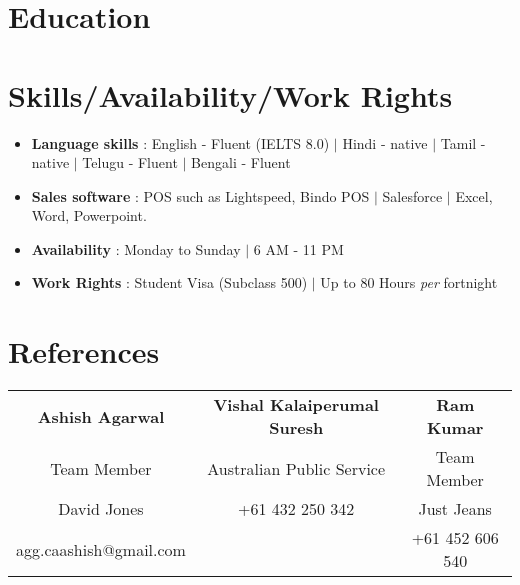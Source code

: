 \documentclass{resume_class_casual}
\begin{document}
	\section{Education}
	\section{Skills/Availability/Work Rights}
	\begin{itemize}[leftmargin = 10pt , labelsep = 3pt , parsep = 0pt , itemsep = 1pt , label =  {\small $\bullet$} ] 
		\item \mdseries \Large { \textbf{Language skills} : English - Fluent (IELTS 8.0) $|$ Hindi - native $|$ Tamil - native $|$ Telugu - Fluent $|$ Bengali - Fluent   }
		\item \mdseries \Large  {\textbf{Sales software} : POS such as Lightspeed, Bindo POS $|$ Salesforce $|$ Excel, Word, Powerpoint. }
		\item \mdseries \Large {\textbf{Availability} : Monday to Sunday $|$ 6 AM - 11 PM}
		\item \mdseries \Large {\textbf{Work Rights} : Student Visa (Subclass 500)  $|$ Up to 80 Hours \textit{per} fortnight}
		
	\end{itemize}
	
	\section{References}
	\begin{tabular}{|c|c|c|} 
		\textbf{Ashish Agarwal}  & \textbf{Vishal Kalaiperumal Suresh} & \textbf{Ram Kumar} \\
		Team Member & Australian Public Service & Team Member \\  
		David Jones & +61 432 250 342 & Just Jeans\\
		agg.caashish@gmail.com & & +61 452 606 540
	\end{tabular}	
\end{document}
